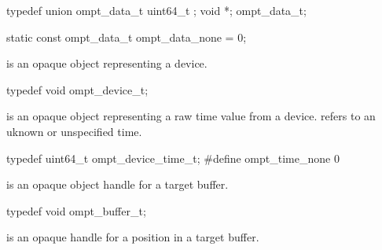 \begin{ccppspecific}
\begin{omptOther}
typedef union ompt_data_t {
  uint64_t ;
  void *;
} ompt_data_t;

static const ompt_data_t ompt_data_none = {0};
\end{omptOther}
\end{ccppspecific}




\label{sec:ompt_device_t}
 is an opaque object representing a device.


\begin{ccppspecific}
\begin{omptOther}
typedef void ompt_device_t;
\end{omptOther}
\end{ccppspecific}





\label{sec:ompt_device_time_t}
 is an opaque object representing a raw time value from a device.
\label{sec:ompt_time_none}
 refers to an uknown or unspecified time.


\begin{ccppspecific}
\begin{omptOther}
typedef uint64_t ompt_device_time_t;
#define ompt_time_none 0
\end{omptOther}
\end{ccppspecific}





\label{sec:ompt_buffer_t}
 is an opaque object handle for a target buffer.


\begin{ccppspecific}
\begin{omptOther}
typedef void ompt_buffer_t;
\end{omptOther}
\end{ccppspecific}





\label{sec:ompt_buffer_cursor_t}
 is an opaque handle for a position in a target buffer.


